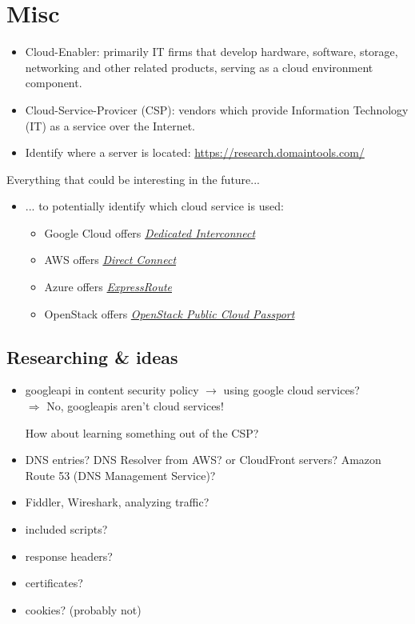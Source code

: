 \documentclass[12pt]{article}
\begin{document}
\section*{Misc}
\begin{itemize}
    \item Cloud-Enabler: primarily IT firms that develop hardware, software, storage, networking and other related products, serving as a cloud environment component.
    \item Cloud-Service-Provicer (CSP): vendors which provide Information Technology (IT) as a service over the Internet.
    \item Identify where a server is located: \url{https://research.domaintools.com/}
\end{itemize}
Everything that could be interesting in the future... 
\begin{itemize}
    \item ... to potentially identify which cloud service is used:
    \begin{itemize}
    \item Google Cloud offers \href{https://cloud.google.com/interconnect/docs/concepts/dedicated-overview}{\textit{Dedicated Interconnect}}
    \item AWS offers \href{https://aws.amazon.com/directconnect/}{\textit{Direct Connect}}
    \item Azure offers \href{https://azure.microsoft.com/en-us/services/expressroute/}{\textit{ExpressRoute}}
    \item OpenStack offers \href{https://www.openstack.org/passport/}{\textit{OpenStack Public Cloud Passport}}
\end{itemize}
\end{itemize}


\subsection*{Researching \& ideas}
\begin{itemize}
    \item googleapi in content security policy $\rightarrow$ using google cloud services? \\
    $\Rightarrow$ No, googleapis aren't cloud services!
    
    How about learning something out of the CSP?
    
    \item DNS entries? DNS Resolver from AWS? or CloudFront servers? Amazon Route 53 (DNS Management Service)?
    
    \item Fiddler, Wireshark, analyzing traffic?
    
    \item included scripts?
    
    \item response headers?
    
    \item certificates?
    
    \item cookies? (probably not)
\end{itemize}
\end{document}
